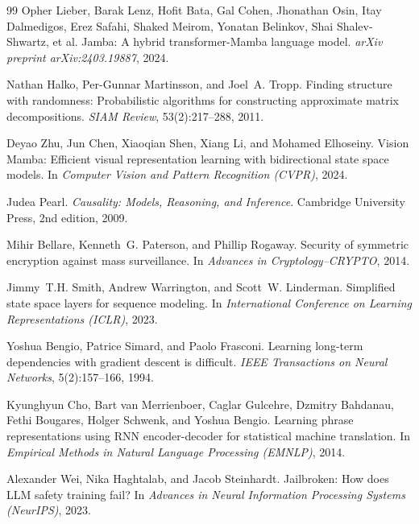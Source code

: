 \documentclass[10pt,twocolumn]{article}
\begin{document}
\begin{thebibliography}{99}
Opher Lieber, Barak Lenz, Hofit Bata, Gal Cohen, Jhonathan Osin, Itay Dalmedigos, Erez Safahi, Shaked Meirom, Yonatan Belinkov, Shai Shalev-Shwartz, et al.
\newblock Jamba: A hybrid transformer-Mamba language model.
\newblock \emph{arXiv preprint arXiv:2403.19887}, 2024.

Nathan Halko, Per-Gunnar Martinsson, and Joel~A. Tropp.
\newblock Finding structure with randomness: Probabilistic algorithms for constructing approximate matrix decompositions.
\newblock \emph{SIAM Review}, 53(2):217--288, 2011.

Deyao Zhu, Jun Chen, Xiaoqian Shen, Xiang Li, and Mohamed Elhoseiny.
\newblock Vision Mamba: Efficient visual representation learning with bidirectional state space models.
\newblock In \emph{Computer Vision and Pattern Recognition (CVPR)}, 2024.

Judea Pearl.
\newblock \emph{Causality: Models, Reasoning, and Inference}.
\newblock Cambridge University Press, 2nd edition, 2009.

Mihir Bellare, Kenneth~G. Paterson, and Phillip Rogaway.
\newblock Security of symmetric encryption against mass surveillance.
\newblock In \emph{Advances in Cryptology--CRYPTO}, 2014.

Jimmy~T.H. Smith, Andrew Warrington, and Scott~W. Linderman.
\newblock Simplified state space layers for sequence modeling.
\newblock In \emph{International Conference on Learning Representations (ICLR)}, 2023.

Yoshua Bengio, Patrice Simard, and Paolo Frasconi.
\newblock Learning long-term dependencies with gradient descent is difficult.
\newblock \emph{IEEE Transactions on Neural Networks}, 5(2):157--166, 1994.

Kyunghyun Cho, Bart van Merrienboer, Caglar Gulcehre, Dzmitry Bahdanau, Fethi Bougares, Holger Schwenk, and Yoshua Bengio.
\newblock Learning phrase representations using RNN encoder-decoder for statistical machine translation.
\newblock In \emph{Empirical Methods in Natural Language Processing (EMNLP)}, 2014.

Alexander Wei, Nika Haghtalab, and Jacob Steinhardt.
\newblock Jailbroken: How does LLM safety training fail?
\newblock In \emph{Advances in Neural Information Processing Systems (NeurIPS)}, 2023.


\end{thebibliography}
\end{document}

